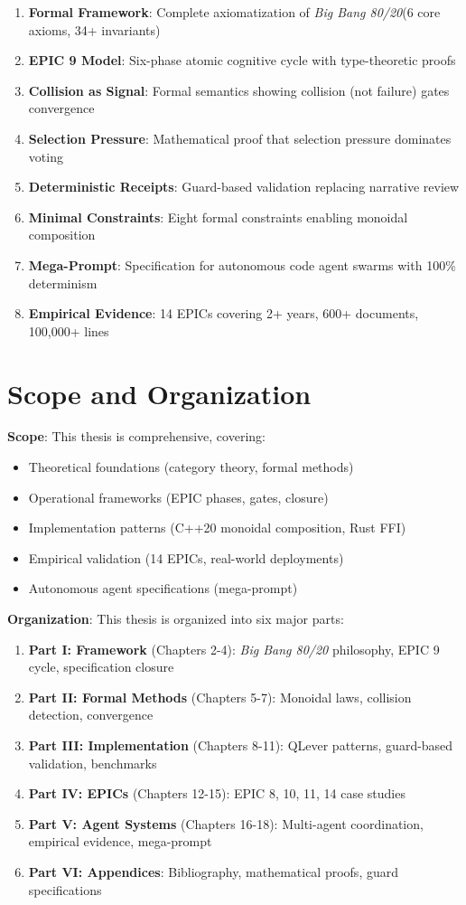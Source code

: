 \documentclass[12pt,oneside,a4paper]{book}
\newcommand{\BB}{\textit{Big Bang 80/20}\xspace}
\theoremstyle{definition}
\begin{document}
\begin{enumerate}
  \item \textbf{Formal Framework}: Complete axiomatization of \BB (6 core axioms, 34+ invariants)
  \item \textbf{EPIC 9 Model}: Six-phase atomic cognitive cycle with type-theoretic proofs
  \item \textbf{Collision as Signal}: Formal semantics showing collision (not failure) gates convergence
  \item \textbf{Selection Pressure}: Mathematical proof that selection pressure dominates voting
  \item \textbf{Deterministic Receipts}: Guard-based validation replacing narrative review
  \item \textbf{Minimal Constraints}: Eight formal constraints enabling monoidal composition
  \item \textbf{Mega-Prompt}: Specification for autonomous code agent swarms with 100\% determinism
  \item \textbf{Empirical Evidence}: 14 EPICs covering 2+ years, 600+ documents, 100,000+ lines
\end{enumerate}

\section{Scope and Organization}
\label{sec:intro-scope}

\textbf{Scope}: This thesis is comprehensive, covering:
\begin{itemize}
  \item Theoretical foundations (category theory, formal methods)
  \item Operational frameworks (EPIC phases, gates, closure)
  \item Implementation patterns (C++20 monoidal composition, Rust FFI)
  \item Empirical validation (14 EPICs, real-world deployments)
  \item Autonomous agent specifications (mega-prompt)
\end{itemize}

\textbf{Organization}: This thesis is organized into six major parts:

\begin{enumerate}
  \item \textbf{Part I: Framework} (Chapters 2-4): \BB philosophy, EPIC 9 cycle, specification closure
  \item \textbf{Part II: Formal Methods} (Chapters 5-7): Monoidal laws, collision detection, convergence
  \item \textbf{Part III: Implementation} (Chapters 8-11): QLever patterns, guard-based validation, benchmarks
  \item \textbf{Part IV: EPICs} (Chapters 12-15): EPIC 8, 10, 11, 14 case studies
  \item \textbf{Part V: Agent Systems} (Chapters 16-18): Multi-agent coordination, empirical evidence, mega-prompt
  \item \textbf{Part VI: Appendices}: Bibliography, mathematical proofs, guard specifications
\end{enumerate}
\end{document}
